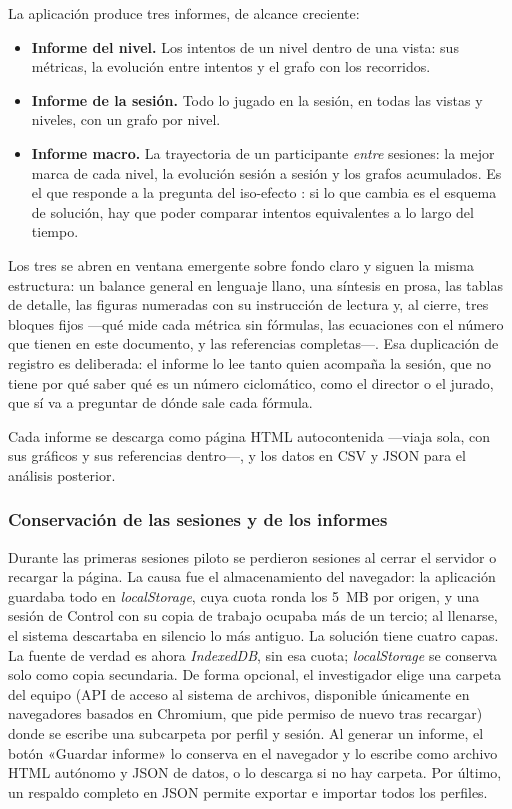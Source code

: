 \documentclass{book}
\begin{document}
La aplicación produce tres informes, de alcance creciente:

\begin{itemize}
    \item \textbf{Informe del nivel.} Los intentos de un nivel dentro de una
    vista: sus métricas, la evolución entre intentos y el grafo con los
    recorridos.

    \item \textbf{Informe de la sesión.} Todo lo jugado en la sesión, en
    todas las vistas y niveles, con un grafo por nivel.

    \item \textbf{Informe macro.} La trayectoria de un participante
    \textit{entre} sesiones: la mejor marca de cada nivel, la evolución
    sesión a sesión y los grafos acumulados. Es el que responde a la
    pregunta del iso-efecto \citep{HinzFaber2009}: si lo que cambia es el
    esquema de solución, hay que poder comparar intentos equivalentes a lo
    largo del tiempo.
\end{itemize}

Los tres se abren en ventana emergente sobre fondo claro y siguen la misma
estructura: un balance general en lenguaje llano, una síntesis en prosa,
las tablas de detalle, las figuras numeradas con su instrucción de lectura
y, al cierre, tres bloques fijos —qué mide cada métrica sin fórmulas, las
ecuaciones con el número que tienen en este documento, y las referencias
completas—. Esa duplicación de registro es deliberada: el informe lo lee
tanto quien acompaña la sesión, que no tiene por qué saber qué es un
número ciclomático, como el director o el jurado, que sí va a preguntar de
dónde sale cada fórmula.

Cada informe se descarga como página HTML autocontenida —viaja sola, con
sus gráficos y sus referencias dentro—, y los datos en CSV y JSON para el
análisis posterior.

\subsubsection{Conservación de las sesiones y de los informes}

Durante las primeras sesiones piloto se perdieron sesiones al cerrar el servidor o recargar la página. La causa fue el almacenamiento del navegador: la aplicación guardaba todo en \textit{localStorage}, cuya cuota ronda los 5~MB por origen, y una sesión de Control con su copia de trabajo ocupaba más de un tercio; al llenarse, el sistema descartaba en silencio lo más antiguo. La solución tiene cuatro capas. La fuente de verdad es ahora \textit{IndexedDB}, sin esa cuota; \textit{localStorage} se conserva solo como copia secundaria. De forma opcional, el investigador elige una carpeta del equipo (API de acceso al sistema de archivos, disponible únicamente en navegadores basados en Chromium, que pide permiso de nuevo tras recargar) donde se escribe una subcarpeta por perfil y sesión. Al generar un informe, el botón «Guardar informe» lo conserva en el navegador y lo escribe como archivo HTML autónomo y JSON de datos, o lo descarga si no hay carpeta. Por último, un respaldo completo en JSON permite exportar e importar todos los perfiles.
\end{document}
